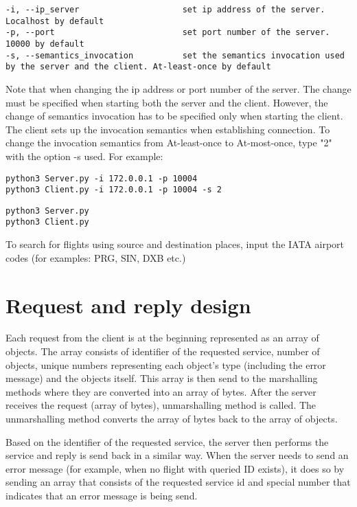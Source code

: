 \documentclass[12pt,a4paper]{article}
\begin{document}
\begin{lstlisting}[caption={Options},xleftmargin=.03\textwidth]
-i, --ip_server                     set ip address of the server. Localhost by default
-p, --port                          set port number of the server. 10000 by default
-s, --semantics_invocation          set the semantics invocation used by the server and the client. At-least-once by default
\end{lstlisting}
\medskip

Note that when changing the ip address or port number of the server. The change must be specified when starting both the server and the client. However, the change of semantics invocation has to be specified only when starting the client. The client sets up the invocation semantics when establishing connection. To change the invocation semantics from At-least-once to At-most-once, type "2" with the option -s used. For example:

\begin{lstlisting}[caption={Example how to run the program},xleftmargin=.03\textwidth]
python3 Server.py -i 172.0.0.1 -p 10004
python3 Client.py -i 172.0.0.1 -p 10004 -s 2
\end{lstlisting}
\medskip

\begin{lstlisting}[caption={Example how to run the program, with all options set to default},xleftmargin=.03\textwidth]
python3 Server.py
python3 Client.py
\end{lstlisting}
\medskip

To search for flights using source and destination places, input the IATA airport codes (for examples: PRG, SIN, DXB etc.)

\section{Request and reply design}
Each request from the client is at the beginning represented as an array of objects. The array consists of identifier of the requested service, number of objects, unique numbers representing each object's type (including the error message) and the objects itself. This array is then send to the marshalling methods where they are converted into an array of bytes. After the server receives the request (array of bytes), unmarshalling method is called. The unmarshalling method converts the array of bytes back to the array of objects.\par \medskip Based on the identifier of the requested service, the server then performs the service and reply is send back in a similar way. When the server needs to send an error message (for example, when no flight with queried ID exists), it does so by sending an array that consists of the requested service id and special number that indicates that an error message is being send.  
\end{document}
